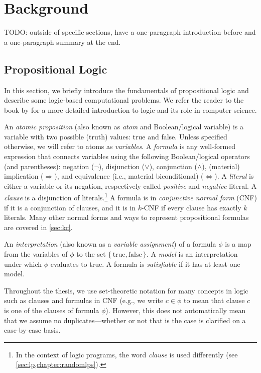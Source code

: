 \chapter{Background}

TODO: outside of specific sections, have a one-paragraph introduction before and a one-paragraph summary at the end.

\section{Propositional Logic} \label{sec:proplogic}

In this section, we briefly introduce the fundamentals of propositional logic and describe some logic-based computational problems. We refer the reader to the book by \cite{DBLP:books/daglib/0029942} for a more detailed introduction to logic and its role in computer science.

An \emph{atomic proposition} (also known as \emph{atom} and Boolean/logical variable) is a variable with two possible (truth) values: true and false. Unless specified otherwise, we will refer to atoms as \emph{variables}. A \emph{formula} is any well-formed expression that connects variables using the following Boolean/logical operators (and parentheses): negation ($\neg$), disjunction ($\lor$), conjunction ($\land$), (material) implication ($\Rightarrow$), and equivalence (i.e., material biconditional) ($\Leftrightarrow$). A \emph{literal} is either a variable or its negation, respectively called \emph{positive} and \emph{negative} literal. A \emph{clause} is a disjunction of literals.\footnote{In the context of logic programs, the word \emph{clause} is used differently (see \cref{sec:lp,chapter:randomlps}).} A formula is in \emph{conjunctive normal form} (CNF) if it is a conjunction of clauses, and it is in $k$-CNF if every clause has exactly $k$ literals. Many other normal forms and ways to represent propositional formulas are covered in \cref{sec:kc}.

An \emph{interpretation} (also known as a \emph{variable assignment}) of a formula $\phi$ is a map from the variables of $\phi$ to the set $\{\, \text{true}, \text{false} \,\}$. A \emph{model} is an interpretation under which $\phi$ evaluates to true. A formula is \emph{satisfiable} if it has at least one model.

Throughout the thesis, we use set-theoretic notation for many concepts in logic such as clauses and formulas in CNF (e.g., we write $c \in \phi$ to mean that clause $c$ is one of the clauses of formula $\phi$). However, this does not automatically mean that we assume no duplicates---whether or not that is the case is clarified on a case-by-case basis.

